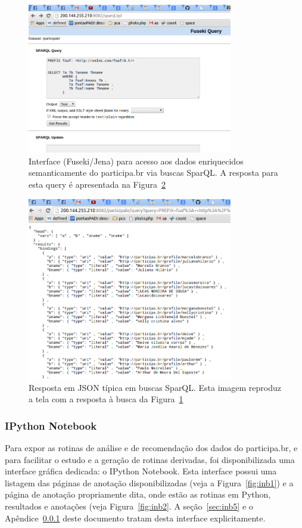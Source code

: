 \documentclass[12pt]{article}
\begin{document}
\begin{figure}[h!]
  \centering
      \includegraphics[width=0.8\textwidth]{screenshots/sparql}
  \caption{Interface (Fuseki/Jena) para acesso aos dados enriquecidos semanticamente do participa.br via buscas SparQL. A resposta para esta query é apresentada na Figura~\ref{fig:sparqlResp}}\label{fig:sparql}
\end{figure}


\begin{figure}[h!]
  \centering
      \includegraphics[width=0.8\textwidth]{screenshots/sparqlResp}
  \caption{Resposta em JSON típica em buscas SparQL. Esta imagem reproduz a tela com a resposta à busca da Figura~\ref{fig:sparql}}\label{fig:sparqlResp}
\end{figure}

\subsubsection{IPython Notebook}\label{sec:inb}
Para expor as rotinas de análise e de recomendação dos dados do participa.br, e para facilitar o estudo e a geração de rotinas derivadas, foi disponibilizada uma interface gráfica dedicada: o IPython Notebook. Esta interface possui uma listagem das páginas de anotação disponibilizadas (veja a Figura~\ref{fig:inb1}) e a página de anotação propriamente dita, onde estão as rotinas em Python, resultados e anotações (veja Figura~\ref{fig:inb2}. A seção~\ref{sec:inb5} e o Apêndice~\ref{sec:inb} deste documento tratam desta interface explicitamente.
\end{document}

